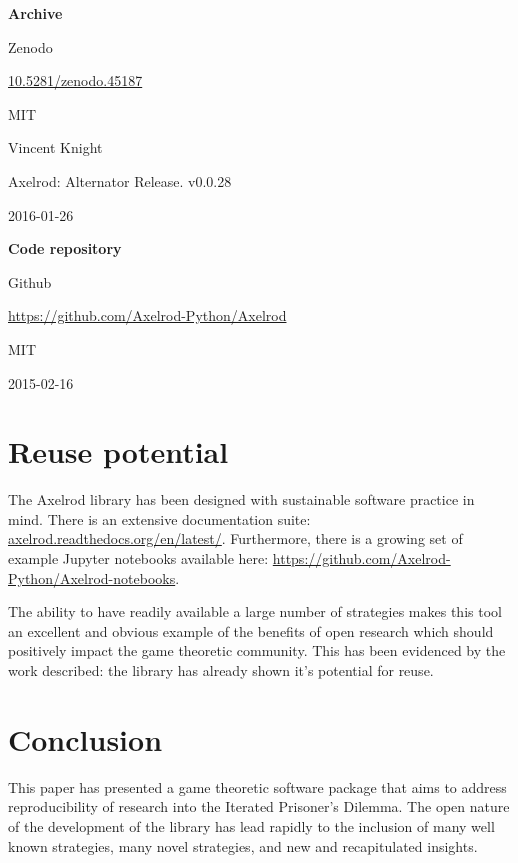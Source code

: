 \documentclass{jors}
\begin{document}
{\bf Archive}

\begin{description}[noitemsep,topsep=0pt]
    \item[Name:] Zenodo
    \item[Persistent identifier:]
\href{https://zenodo.org/record/45187}{10.5281/zenodo.45187}
    \item[Licence:] MIT
    \item[Publisher:]  Vincent Knight
    \item[Version published:] Axelrod: Alternator Release. v0.0.28
    \item[Date published:] 2016-01-26
\end{description}

{\bf Code repository}

\begin{description}[noitemsep,topsep=0pt]
    \item[Name:] Github
    \item[Identifier:] \url{https://github.com/Axelrod-Python/Axelrod}
    \item[Licence:] MIT
    \item[Date published:] 2015-02-16
\end{description}

\section*{Reuse potential}\label{sec:reuse}

The Axelrod library has been designed with sustainable software practice in
mind. There is an extensive documentation suite:
\url{axelrod.readthedocs.org/en/latest/}. Furthermore, there is a growing set
of example Jupyter notebooks available here:
\url{https://github.com/Axelrod-Python/Axelrod-notebooks}.

The ability to have readily available a large number of strategies makes this
tool an excellent and obvious example of the benefits of open research which
should positively impact the game theoretic community.
This has been evidenced by the work described: the library has already shown
it's potential for reuse.

\section*{Conclusion}

This paper has presented a game theoretic software package that aims to address
reproducibility of research into the Iterated Prisoner's Dilemma. The open
nature of the development of the library has lead rapidly to the inclusion of
many well known strategies, many novel strategies, and new and recapitulated
insights.
\end{document}
